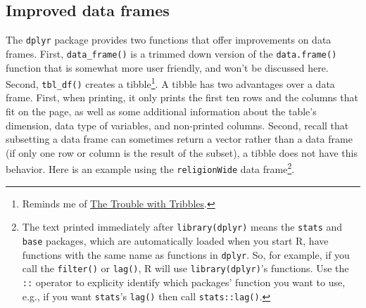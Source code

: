 \documentclass[12pt,oneside]{book}\usepackage[]{graphicx}\usepackage[]{color}
\begin{document}
\subsection{Improved data frames}
The \verb+dplyr+ package provides two functions that offer improvements on data frames. First, \verb+data_frame()+ is a trimmed down version of the \verb+data.frame()+ function that is somewhat more user friendly, and won't be discussed here. Second, \verb+tbl_df()+ creates a tibble\footnote{Reminds me of \href{https://en.wikipedia.org/wiki/The_Trouble_with_Tribbles}{The Trouble with Tribbles}.}. A tibble has two advantages over a data frame. First, when printing, it only prints the first ten rows and the columns that fit on the page, as well as some additional information about the table's dimension, data type of variables, and non-printed columns. Second, recall that subsetting a data frame can sometimes return a vector rather than a data frame (if only one row or column is the result of the subset), a tibble does not have this behavior. Here is an example using the \verb+religionWide+ data frame\footnote{The text printed immediately after \texttt{library(dplyr)} means the \texttt{stats} and \texttt{base} packages, which are automatically loaded when you start R, have functions with the same name as functions in \texttt{dplyr}. So, for example, if you call the \texttt{filter()} or \texttt{lag()}, R will use \texttt{library(dplyr)}'s functions. Use the \texttt{::} operator to explicity identify which packages' function you want to use, e.g., if you want \texttt{stats}'s \texttt{lag()} then call \texttt{stats::lag()}.}.
\end{document}
